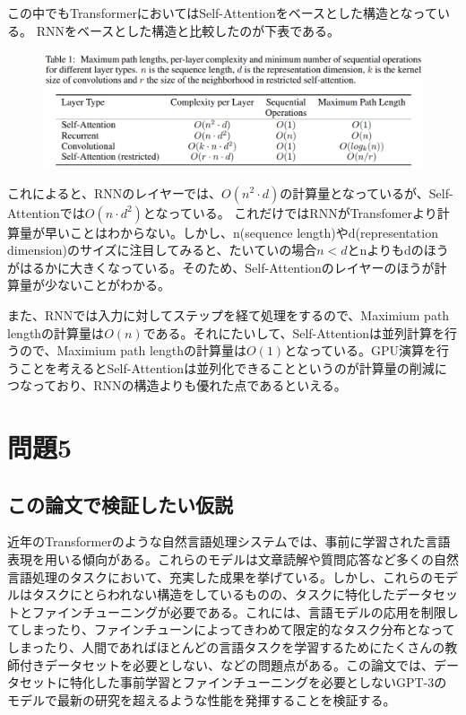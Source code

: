 \documentclass[a4j,11pt]{jarticle}
\begin{document}
この中でもTransformerにおいてはSelf-Attentionをベースとした構造となっている。
RNNをベースとした構造と比較したのが下表である。

\begin{figure}[hbtp]
    \centering
    \includegraphics[width=12cm]{p4-1.png}
\end{figure}

これによると、RNNのレイヤーでは、$O(n^2\cdot d)$の計算量となっているが、Self-Attentionでは$O(n \cdot d^2)$となっている。
これだけではRNNがTransfomerより計算量が早いことはわからない。しかし、n(sequence length)やd(representation dimension)のサイズに注目してみると、たいていの場合$n < d$とnよりもdのほうがはるかに大きくなっている。そのため、Self-Attentionのレイヤーのほうが計算量が少ないことがわかる。

また、RNNでは入力に対してステップを経て処理をするので、Maximium path lengthの計算量は$O(n)$である。それにたいして、Self-Attentionは並列計算を行うので、Maximium path lengthの計算量は$O(1)$となっている。GPU演算を行うことを考えるとSelf-Attentionは並列化できることというのが計算量の削減につなっており、RNNの構造よりも優れた点であるといえる。


\newpage
\section{問題5}
\subsection*{この論文で検証したい仮説}
近年のTransformerのような自然言語処理システムでは、事前に学習された言語表現を用いる傾向がある。これらのモデルは文章読解や質問応答など多くの自然言語処理のタスクにおいて、充実した成果を挙げている。しかし、これらのモデルはタスクにとらわれない構造をしているものの、タスクに特化したデータセットとファインチューニングが必要である。これには、言語モデルの応用を制限してしまったり、ファインチューンによってきわめて限定的なタスク分布となってしまったり、人間であればほとんどの言語タスクを学習するためにたくさんの教師付きデータセットを必要としない、などの問題点がある。この論文では、データセットに特化した事前学習とファインチューニングを必要としないGPT-3のモデルで最新の研究を超えるような性能を発揮することを検証する。
\end{document}
